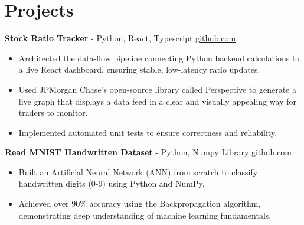 \documentclass[11pt]{article}       %
\begin{document}

\vspace{-18.5pt}

\section*{Projects}

\textbf{Stock Ratio Tracker}{ - Python, React, Typescript} \hfill \href{https://github.com/Monica20030707/Trading-Dashboard_UI}{github.com} \\
\vspace{-9pt}
\begin{itemize}
  \item Architected the data-flow pipeline connecting Python backend calculations to a live React dashboard, ensuring stable, low-latency ratio updates. 
  \item Used JPMorgan Chase’s open-source library called Perspective to generate a live graph that displays a data feed in a clear and visually appealing way for traders to monitor.
  \item Implemented automated unit tests to ensure correctness and reliability.
  
\end{itemize}

\textbf{Read MNIST Handwritten Dataset}{ - Python, Numpy Library} \hfill \href{https://github.com/Monica20030707/Artificial-Neutral-Network_ML}{github.com} \\
\vspace{-9pt}
\begin{itemize} 
  \item Built an Artificial Neural Network (ANN) from scratch to classify handwritten digits (0-9) using Python and NumPy.
  \item Achieved over 90\% accuracy using the Backpropagation algorithm, demonstrating deep understanding of machine learning fundamentals.
\end{itemize}
\end{document}
